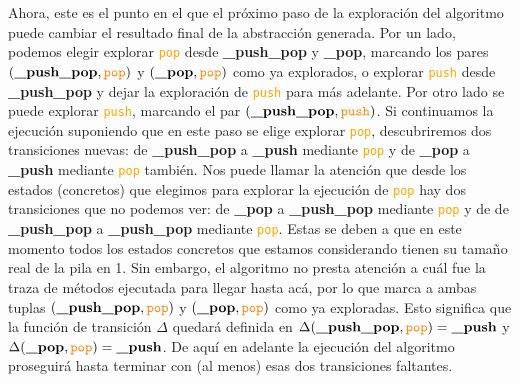 Ahora, este es el punto en el que el próximo paso de la exploración del algoritmo puede cambiar el resultado final de la abstracción generada.
Por un lado, podemos elegir explorar \textcolor{orange}{\texttt{pop}} desde \textbf{\_push\_pop} y \textbf{\_pop}, marcando los pares $(\textbf{\_push\_pop},\textcolor{orange}{\texttt{pop}})$ y $(\textbf{\_pop},\textcolor{orange}{\texttt{pop}})$ como ya explorados, o explorar \textcolor{orange}{\texttt{push}} desde \textbf{\_push\_pop} y dejar la exploración de \textcolor{orange}{\texttt{push}} para más adelante.
Por otro lado se puede explorar \textcolor{orange}{\texttt{push}}, marcando el par $(\textbf{\_push\_pop},\textcolor{orange}{\texttt{push}})$.
Si continuamos la ejecución suponiendo que en este paso se elige explorar \textcolor{orange}{\texttt{pop}}, descubriremos dos transiciones nuevas: de \textbf{\_push\_pop} a \textbf{\_push} mediante \textcolor{orange}{\texttt{pop}} y de \textbf{\_pop} a \textbf{\_push} mediante \textcolor{orange}{\texttt{pop}} también.
Nos puede llamar la atención que desde los estados (concretos) que elegimos para explorar la ejecución de \textcolor{orange}{\texttt{pop}} hay dos transiciones que no podemos ver: de \textbf{\_pop} a \textbf{\_push\_pop} mediante \textcolor{orange}{\texttt{pop}} y de de \textbf{\_push\_pop} a \textbf{\_push\_pop} mediante \textcolor{orange}{\texttt{pop}}.
Estas se deben a que en este momento todos los estados concretos que estamos considerando tienen su tamaño real de la pila en 1.
Sin embargo, el algoritmo no presta atención a cuál fue la traza de métodos ejecutada para llegar hasta acá, por lo que marca a ambas tuplas $(\textbf{\_push\_pop},\textcolor{orange}{\texttt{pop}})$ y $(\textbf{\_pop},\textcolor{orange}{\texttt{pop}})$ como ya exploradas.
Esto significa que la función de transición $\Delta$ quedará definida en $\Delta(\textbf{\_push\_pop},\textcolor{orange}{\texttt{pop}}) = \textbf{\_push}$ y $\Delta(\textbf{\_pop},\textcolor{orange}{\texttt{pop}}) = \textbf{\_push}$.
De aquí en adelante la ejecución del algoritmo proseguirá hasta terminar con (al menos) esas dos transiciones faltantes.


